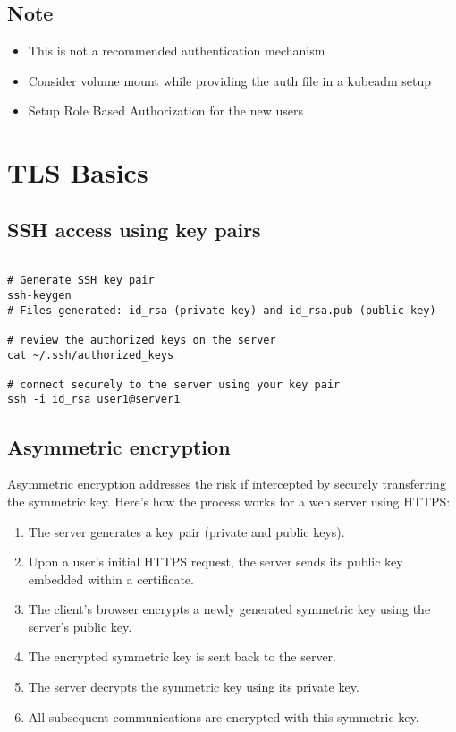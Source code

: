 \documentclass[11pt]{article}
\begin{document}
\subsection{Note}
\label{sec:org963a17c}

\begin{itemize}
\item This is not a recommended authentication mechanism
\item Consider volume mount while providing the auth file in a kubeadm setup
\item Setup Role Based Authorization for the new users
\end{itemize}
\section{TLS Basics}
\label{sec:orgfee8373}

\subsection{SSH access using key pairs}
\label{sec:orge6227cf}

\begin{verbatim}

# Generate SSH key pair
ssh-keygen
# Files generated: id_rsa (private key) and id_rsa.pub (public key)

# review the authorized keys on the server
cat ~/.ssh/authorized_keys

# connect securely to the server using your key pair
ssh -i id_rsa user1@server1

\end{verbatim}
\subsection{Asymmetric encryption}
\label{sec:org3746642}

Asymmetric encryption addresses the risk if intercepted by securely transferring the symmetric key.
Here’s how the process works for a web server using HTTPS:

\begin{enumerate}
\item The server generates a key pair (private and public keys).
\item Upon a user's initial HTTPS request, the server sends its public key embedded within a certificate.
\item The client's browser encrypts a newly generated symmetric key using the server’s public key.
\item The encrypted symmetric key is sent back to the server.
\item The server decrypts the symmetric key using its private key.
\item All subsequent communications are encrypted with this symmetric key.
\end{enumerate}
\end{document}
